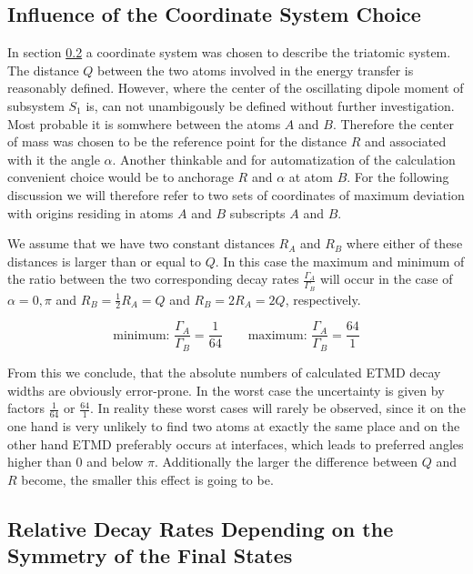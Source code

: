 \subsection{Influence of the Coordinate System Choice}
In section \ref{} a coordinate system was chosen to describe the
triatomic system. The distance $Q$ between the two atoms involved
in the energy transfer is reasonably defined. However, where the
center of the oscillating dipole moment of subsystem $S_1$ is, can
not unambigously be defined without further investigation. Most
probable it is somwhere between the atoms $A$ and $B$. Therefore
the center of mass was chosen to be the reference point for the
distance $R$ and associated with it the angle $\alpha$.
Another thinkable and for automatization of the calculation
convenient choice would be to anchorage $R$ and $\alpha$ at
atom $B$.
For the following discussion we will therefore refer to two sets
of coordinates of maximum deviation with origins residing in atoms
$A$ and $B$ subscripts $A$ and $B$.

We assume that we have two constant distances $R_{A}$ and $R_B$
where either of these distances is larger than or equal to $Q$.
In this case the maximum and minimum of the ratio between the two
corresponding decay rates $\frac{\Gamma_{A}}{\Gamma_B}$ will occur
in the case of $\alpha = 0,\pi$ and $R_B = \frac 12 R_{A} = Q$
and $R_B = 2 R_{A} = 2Q$, respectively.

\begin{equation}
\text{minimum: } \frac{\Gamma_{A}}{\Gamma_B}= \frac{1}{64} \quad\quad
\text{maximum: } \frac{\Gamma_{A}}{\Gamma_B}= \frac{64}{1}
\end{equation}

From this we conclude, that the absolute numbers of calculated ETMD
decay widths are obviously error-prone. In the worst case the uncertainty
is given by factors $\frac{1}{64}$ or $\frac{64}{1}$.
In reality these worst cases will rarely be observed, since it on
the one hand is very unlikely to find two atoms at exactly the same place
and on the other hand ETMD preferably occurs at interfaces, which leads
to preferred angles higher than 0 and below $\pi$.
Additionally the larger the difference between $Q$ and $R$ become, the
smaller this effect is going to be.


\subsection{Relative Decay Rates Depending on the Symmetry of the Final States}
